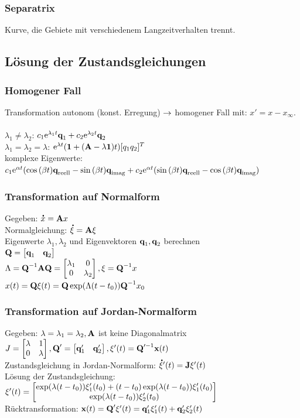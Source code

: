 \documentclass[fs, footer]{latex4ei}
\begin{document}
\begin{multicols*}{4}
		\subsubsection{Separatrix}
		Kurve, die Gebiete mit verschiedenem Langzeitverhalten trennt.
	\subsection{Lösung der Zustandsgleichungen}
		\subsubsection{Homogener Fall}
		Transformation autonom (konst. Erregung) $\rightarrow$ homogener Fall mit: $x' = x - x_\infty$.\\ \\
		$\lambda_1 \neq \lambda_2$: $c_1\mathrm{e}^{\lambda_1t}\textbf{q}_1 + c_2\mathrm{e}^{\lambda_2t}\textbf{q}_2$\\
		$\lambda_1 = \lambda_2 = \lambda$: $\mathrm{e}^{\lambda t}(\textbf{1} + (\textbf{A} -\lambda \textbf{1})t) [q_1 q_2]^T$\\
		komplexe Eigenwerte: $c_1 \mathrm{e}^{\alpha t}(\cos{(\beta t)}\textbf{q}_{\text{reell}} - \sin{(\beta t)}\textbf{q}_{\text{imag}} + c_2\mathrm{e}^{\alpha t}(\sin{(\beta t)}\textbf{q}_{\text{reell}} - \cos{(\beta t)}\textbf{q}_{\text{imag}})$\\
		\subsubsection{Transformation auf Normalform}
		Gegeben: $\accentset{\mbox{\textrm{\large\bfseries .}} }{x} = \textbf{A} x$\\
		Normalgleichung: $\accentset{\mbox{\textrm{\large\bfseries .}} }{\xi} = \textbf{A}\xi$\\
		Eigenwerte $\lambda_1, \lambda_2$ und Eigenvektoren $\textbf{q}_1, \textbf{q}_2$ berechnen\\
		$\textbf{Q} =  \begin{bmatrix} \textbf{q}_1 & \textbf{q}_2  \end{bmatrix}$\\
		$\Lambda = \textbf{Q}^{-1}\textbf{A}\textbf{Q} = \begin{bmatrix} \lambda_1 & 0 \\ 0 & \lambda_2  \end{bmatrix}, \xi = \textbf{Q}^{-1} x$\\
		$x(t) = \textbf{Q} \xi(t) = \textbf{Q} \exp(\Lambda(t-t_0))\textbf{Q}^{-1} x_0$\\
		\subsubsection{Transformation auf Jordan-Normalform}
		Gegeben: $\lambda = \lambda_1 = \lambda_2, \textbf{A}$ ist keine Diagonalmatrix\\
		$J = \begin{bmatrix} \lambda & 1 \\ 0 & \lambda \end{bmatrix}, \textbf{Q}' = \begin{bmatrix} \textbf{q}_1' & \textbf{q}_2' \end{bmatrix}, \xi'(t) = \textbf{Q}'^{-1}\textbf{x}(t)$\\
		Zustandsgleichung in Jordan-Normalform: $\accentset{\mbox{\textrm{\large\bfseries .}} }{\xi} '(t) = \textbf{J} \xi '(t)$\\
		Lösung der Zustandsgleichung:\\ $\xi '(t) = \begin{bmatrix} \exp(\lambda(t-t_0))\xi_1'(t_0)+(t-t_0)\exp(\lambda(t-t_0))\xi_1'(t_0) \\ \exp(\lambda(t-t_0))\xi_2'(t_0)  \end{bmatrix}$\\
		Rücktransformation: $\textbf{x}(t) = \textbf{Q}'\xi '(t) = \textbf{q}_1'\xi_1'(t) + \textbf{q}_2'\xi_2'(t)$\\

\end{multicols*}
\end{document}
